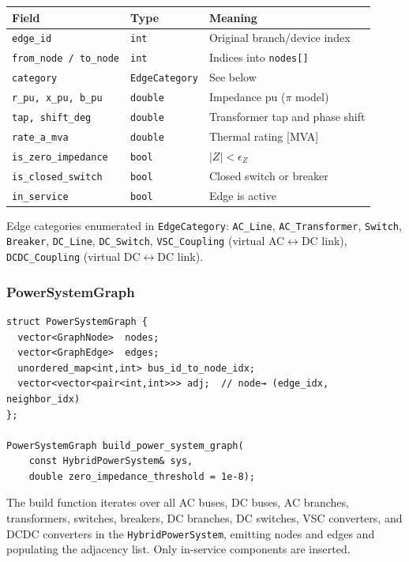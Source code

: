 \begin{center}
\begin{tabular}{lll}
\hline\hline
\textbf{Field} & \textbf{Type} & \textbf{Meaning} \\
\hline
\texttt{edge\_id}          & \texttt{int}           & Original branch/device index \\
\texttt{from\_node / to\_node} & \texttt{int}       & Indices into \texttt{nodes[]} \\
\texttt{category}          & \texttt{EdgeCategory}  & See below \\
\texttt{r\_pu, x\_pu, b\_pu} & \texttt{double}     & Impedance pu ($\pi$ model) \\
\texttt{tap, shift\_deg}   & \texttt{double}        & Transformer tap and phase shift \\
\texttt{rate\_a\_mva}      & \texttt{double}        & Thermal rating [MVA] \\
\texttt{is\_zero\_impedance} & \texttt{bool}        & $|Z| < \epsilon_Z$ \\
\texttt{is\_closed\_switch} & \texttt{bool}         & Closed switch or breaker \\
\texttt{in\_service}       & \texttt{bool}          & Edge is active \\
\hline\hline
\end{tabular}
\end{center}

Edge categories enumerated in \texttt{EdgeCategory}:
\texttt{AC\_Line}, \texttt{AC\_Transformer}, \texttt{Switch},
\texttt{Breaker}, \texttt{DC\_Line}, \texttt{DC\_Switch},
\texttt{VSC\_Coupling} (virtual AC$\leftrightarrow$DC link),
\texttt{DCDC\_Coupling} (virtual DC$\leftrightarrow$DC link).

\subsubsection{PowerSystemGraph}

\begin{verbatim}
struct PowerSystemGraph {
  vector<GraphNode>  nodes;
  vector<GraphEdge>  edges;
  unordered_map<int,int> bus_id_to_node_idx;
  vector<vector<pair<int,int>>> adj;  // node→ (edge_idx, neighbor_idx)
};

PowerSystemGraph build_power_system_graph(
    const HybridPowerSystem& sys,
    double zero_impedance_threshold = 1e-8);
\end{verbatim}

The build function iterates over all AC buses, DC buses, AC branches,
transformers, switches, breakers, DC branches, DC switches, VSC converters,
and DCDC converters in the \texttt{HybridPowerSystem}, emitting nodes and
edges and populating the adjacency list.  Only in-service components are
inserted.

